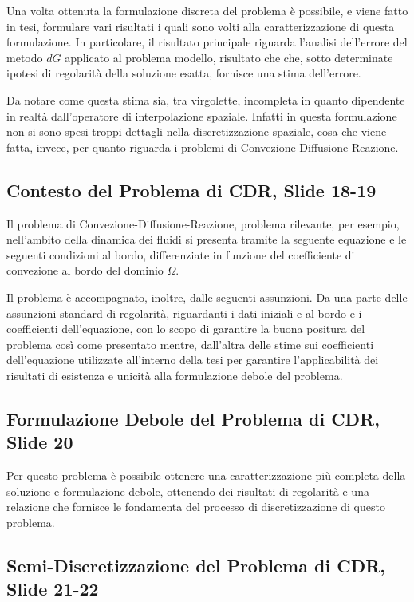 \documentclass[12pt]{article}
\begin{document}
    Una volta ottenuta la formulazione discreta del problema è possibile, e viene fatto in tesi, formulare vari risultati i quali sono volti alla caratterizzazione di questa formulazione. In particolare, il risultato principale riguarda l'analisi dell'errore del metodo $dG$ applicato al problema modello, risultato che che, sotto determinate ipotesi di regolarità della soluzione esatta, fornisce una stima dell'errore.

    Da notare come questa stima sia, tra virgolette, incompleta in quanto dipendente in realtà dall'operatore di interpolazione spaziale. Infatti in questa formulazione non si sono spesi troppi dettagli nella discretizzazione spaziale, cosa che viene fatta, invece, per quanto riguarda i problemi di Convezione-Diffusione-Reazione.

    \subsection{Contesto del Problema di CDR, Slide 18-19}

    Il problema di Convezione-Diffusione-Reazione, problema rilevante, per esempio, nell'ambito della dinamica dei fluidi si presenta tramite la seguente equazione e le seguenti condizioni al bordo, differenziate in funzione del coefficiente di convezione al bordo del dominio $\Omega$.

    Il problema è accompagnato, inoltre, dalle seguenti assunzioni. Da una parte delle assunzioni standard di regolarità, riguardanti i dati iniziali e al bordo e i coefficienti dell'equazione, con lo scopo di garantire la buona positura del problema così come presentato mentre, dall'altra delle stime sui coefficienti dell'equazione utilizzate all'interno della tesi per garantire l'applicabilità dei risultati di esistenza e unicità alla formulazione debole del problema.

    \subsection{Formulazione Debole del Problema di CDR, Slide 20}

    Per questo problema è possibile ottenere una caratterizzazione più completa della soluzione e formulazione debole, ottenendo dei risultati di regolarità e una relazione che fornisce le fondamenta del processo di discretizzazione di questo problema.

    \subsection{Semi-Discretizzazione del Problema di CDR, Slide 21-22}
\end{document}
